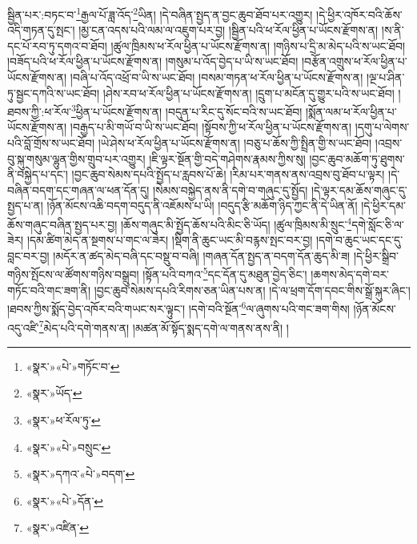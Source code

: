 སྦྱིན་པར་:བཏང་བ་\footnote{«སྣར་»«པེ་»གཏོང་བ་}རྒྱལ་པོ་ཟླ་འོད་\footnote{«སྣར་»ཡོད་}ཡིན། །དེ་བཞིན་སྤྱད་ན་བྱང་ཆུབ་ཐོབ་པར་འགྱུར། །དེ་ཕྱིར་འཁོར་བའི་ཆོས་འདི་གཏན་དུ་སྤང་། །མྱ་ངན་འདས་པའི་ལམ་ལ་འཇུག་པར་བྱ། །སྦྱིན་པའི་ཕ་རོལ་ཕྱིན་པ་ཡོངས་རྫོགས་ན། །ས་ནི་དང་པོ་རབ་ཏུ་དགའ་བ་ཐོབ། །ཚུལ་ཁྲིམས་ཕ་རོལ་ཕྱིན་པ་ཡོངས་རྫོགས་ན། །གཉིས་པ་དྲི་མ་མེད་པའི་ས་ཡང་ཐོབ། །བཟོད་པའི་ཕ་རོལ་ཕྱིན་པ་ཡོངས་རྫོགས་ན། །གསུམ་པ་འོད་བྱེད་པ་ཡི་ས་ཡང་ཐོབ། །བརྩོན་འགྲུས་ཕ་རོལ་ཕྱིན་པ་ཡོངས་རྫོགས་ན། །བཞི་པ་འོད་འཕྲོ་བ་ཡི་ས་ཡང་ཐོབ། །བསམ་གཏན་ཕ་རོལ་ཕྱིན་པ་ཡོངས་རྫོགས་ན། །ལྔ་པ་ཤིན་ཏུ་སྦྱང་དཀའི་ས་ཡང་ཐོབ། །ཤེས་རབ་ཕ་རོལ་ཕྱིན་པ་ཡོངས་རྫོགས་ན། །དྲུག་པ་མངོན་དུ་གྱུར་པའི་ས་ཡང་ཐོབ། །ཐབས་ཀྱི་:ཕ་རོལ་\footnote{«སྣར་»ཕ་རོལ་ཏུ་}ཕྱིན་པ་ཡོངས་རྫོགས་ན། །བདུན་པ་རིང་དུ་སོང་བའི་ས་ཡང་ཐོབ། །སྨོན་ལམ་ཕ་རོལ་ཕྱིན་པ་ཡོངས་རྫོགས་ན། །བརྒྱད་པ་མི་གཡོ་བ་ཡི་ས་ཡང་ཐོབ། །སྟོབས་ཀྱི་ཕ་རོལ་ཕྱིན་པ་ཡོངས་རྫོགས་ན། །དགུ་པ་ལེགས་པའི་བློ་གྲོས་ས་ཡང་ཐོབ། །ཡེ་ཤེས་ཕ་རོལ་ཕྱིན་པ་ཡོངས་རྫོགས་ན། །བཅུ་པ་ཆོས་ཀྱི་སྤྲིན་གྱི་ས་ཡང་ཐོབ། །འབྲས་བུ་སྐུ་གསུམ་ལྷུན་གྱིས་གྲུབ་པར་འགྱུར། །ཇི་ལྟར་སྔོན་གྱི་བདེ་གཤེགས་རྣམས་ཀྱིས་སུ། །བྱང་ཆུབ་མཆོག་ཏུ་ཐུགས་ནི་བསྐྱེད་པ་དང་། །བྱང་ཆུབ་སེམས་དཔའི་སྤྱོད་པ་རླབས་པོ་ཆེ། །རིམ་པར་གནས་ནས་འབྲས་བུ་ཐོབ་པ་ལྟར། །དེ་བཞིན་བདག་དང་གཞན་ལ་ཕན་དོན་དུ། །སེམས་བསྐྱེད་ནས་ནི་དགེ་བ་གཞུང་དུ་སྤྱོད། །དེ་ལྟར་དམ་ཆོས་གཞུང་དུ་སྤྱད་པ་ན། །ཉོན་མོངས་འཆི་བདག་བདུད་ནི་འཇོམས་པ་ཡི། །བདུད་རྩི་མཆོག་ཉིད་ཀྱང་ནི་དེ་ཡིན་ནོ། །དེ་ཕྱིར་དམ་ཆོས་གཞུང་བཞིན་སྤྱད་པར་བྱ། །ཆོས་གཞུང་མི་སྤྱོད་ཆོས་པའི་མིང་ཅི་ཡོད། །ཚུལ་ཁྲིམས་མི་སྲུང་\footnote{«སྣར་»«པེ་»བསྲུང་}དགེ་སློང་ཅི་ལ་ཟེར། །དམ་ཚིག་མེད་ན་སྔགས་པ་གང་ལ་ཟེར། །སྡིག་ནི་ཆུང་ཡང་མི་བརྙས་སྤང་བར་བྱ། །དགེ་བ་ཆུང་ཡང་དང་དུ་བླང་བར་བྱ། །མདོར་ན་ཚད་མེད་བཞི་དང་བསྡུ་བ་བཞི། །གཞན་དོན་སྤྱད་ན་བདག་དོན་ཆུད་མི་ཟ། །དེ་ཕྱིར་སྒྲིབ་གཉིས་སྤོངས་ལ་ཚོགས་གཉིས་བསྒྲུབ། །སྟོན་པའི་བཀའ་\footnote{«སྣར་»དཀའ་«པེ་»བདག་}དང་དོན་དུ་མཐུན་བྱེད་ཅིང་། །ཆགས་མེད་དགེ་བར་གཏོང་བའི་གང་ཟག་ནི། །བྱང་ཆུབ་སེམས་དཔའི་རིགས་ཅན་ཡིན་པས་ན། །དེ་ལ་ཕྲག་དོག་དབང་གིས་སྒྲོ་སྐུར་ཞིང་། །ཐབས་ཀྱིས་སྨོད་བྱེད་འཁོར་བའི་གཡང་སར་ལྟུང་། །དགེ་བའི་སྔོན་\footnote{«སྣར་»«པེ་»དོན་}ལ་ཞུགས་པའི་གང་ཟག་གིས། །ཉོན་མོངས་འདུ་འཛི་\footnote{«སྣར་»འཛིན་}མེད་པའི་དགེ་གནས་ན། །མཚན་མོ་སྟོད་སྨད་དགེ་ལ་གནས་ནས་ནི། །
